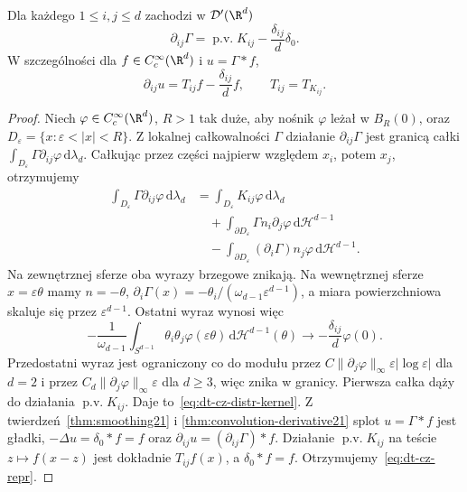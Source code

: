 \begin{lemat}
\label{lem:dt-cz-distr-kernel}
Dla każdego $1\le i,j\le d$ zachodzi w $\mathcal D'(\R^d)$
\begin{equation}\label{eq:dt-cz-distr-kernel}
 \partial_{ij}\Gamma
 =\operatorname{p.v.}K_{ij}-\frac{\delta_{ij}}d\delta_0.
\end{equation}
W szczególności dla $f\in C_c^\infty(\R^d)$ i $u=\Gamma*f$,
\begin{equation}\label{eq:dt-cz-repr}
 \partial_{ij}u=T_{ij}f-\frac{\delta_{ij}}d f,
 \qquad T_{ij}=T_{K_{ij}}.
\end{equation}
\end{lemat}
\begin{proof}
Niech $\varphi\in C_c^\infty(\R^d)$, $R>1$ tak duże,
aby nośnik $\varphi$ leżał w $B_R(0)$, oraz
$D_\varepsilon=\{x:\varepsilon<|x|<R\}$.
Z lokalnej całkowalności $\Gamma$ działanie
$\partial_{ij}\Gamma$ jest granicą całki
$\int_{D_\varepsilon}\Gamma\partial_{ij}\varphi\,\mathrm d\lambda_d$.
Całkując przez części najpierw względem $x_i$, potem
$x_j$, otrzymujemy
\[
 \begin{aligned}
 \int_{D_\varepsilon}\Gamma\partial_{ij}\varphi\,\mathrm d\lambda_d
 &=\int_{D_\varepsilon}K_{ij}\varphi\,\mathrm d\lambda_d\\
 &\quad+\int_{\partial D_\varepsilon}
 \Gamma n_i\partial_j\varphi\,\mathrm d\mathcal H^{d-1}\\
 &\quad-\int_{\partial D_\varepsilon}
 (\partial_i\Gamma)n_j\varphi\,\mathrm d\mathcal H^{d-1}.
 \end{aligned}
\]
Na zewnętrznej sferze oba wyrazy brzegowe znikają.
Na wewnętrznej sferze $x=\varepsilon\theta$ mamy
$n=-\theta$, $\partial_i\Gamma(x)=
-\theta_i/(\omega_{d-1}\varepsilon^{d-1})$,
a miara powierzchniowa skaluje się przez
$\varepsilon^{d-1}$. Ostatni wyraz wynosi więc
\[
 -\frac1{\omega_{d-1}}\int_{S^{d-1}}\theta_i\theta_j
 \varphi(\varepsilon\theta)\,\mathrm d\mathcal H^{d-1}(\theta)
 \longrightarrow-\frac{\delta_{ij}}d\varphi(0).
\]
Przedostatni wyraz jest ograniczony co do modułu przez
$C\|\partial_j\varphi\|_\infty\varepsilon|\log\varepsilon|$
dla $d=2$ i przez $C_d\|\partial_j\varphi\|_\infty\varepsilon$
dla $d\ge3$, więc znika w granicy.
Pierwsza całka dąży do działania $\operatorname{p.v.}K_{ij}$.
Daje to~\eqref{eq:dt-cz-distr-kernel}.
Z twierdzeń~\ref{thm:smoothing21} i
\ref{thm:convolution-derivative21} splot
$u=\Gamma*f$ jest gładki, $-\Delta u=\delta_0*f=f$ oraz
$\partial_{ij}u=(\partial_{ij}\Gamma)*f$.
Działanie $\operatorname{p.v.}K_{ij}$ na teście
$z\mapsto f(x-z)$ jest dokładnie $T_{ij}f(x)$,
a $\delta_0*f=f$. Otrzymujemy~\eqref{eq:dt-cz-repr}.
\end{proof}

